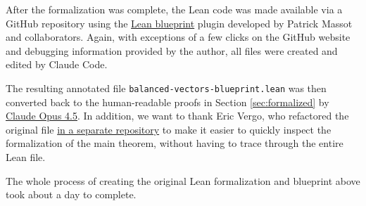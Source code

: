 \documentclass[12pt,reqno]{amsart}
\theoremstyle{definition}
\begin{document}
\begin{humanparagraph}
After the formalization was complete, the Lean code was made available via a GitHub repository using the \href{https://github.com/PatrickMassot/leanblueprint}{Lean blueprint} plugin developed by Patrick Massot and collaborators. Again, with exceptions of a few clicks on the GitHub website and  debugging information provided by the author, all files were created and edited by Claude Code.

The resulting annotated file \texttt{balanced-vectors-blueprint.lean} was then converted back to the human-readable proofs in Section \ref{sec:formalized} by \href{https://claude.ai/share/475ce24b-1d24-44c1-883d-2dd3ae1181d9}{Claude Opus 4.5}. In addition, we want to thank Eric Vergo, who refactored the original file \href{https://github.com/e-vergo/Balanced_Vectors}{in a separate repository} to make it easier to quickly inspect the formalization of the main theorem, without having to trace through the entire Lean file.

The whole process of creating the original Lean formalization and blueprint above took about a day to complete.
\end{humanparagraph}
\end{document}
